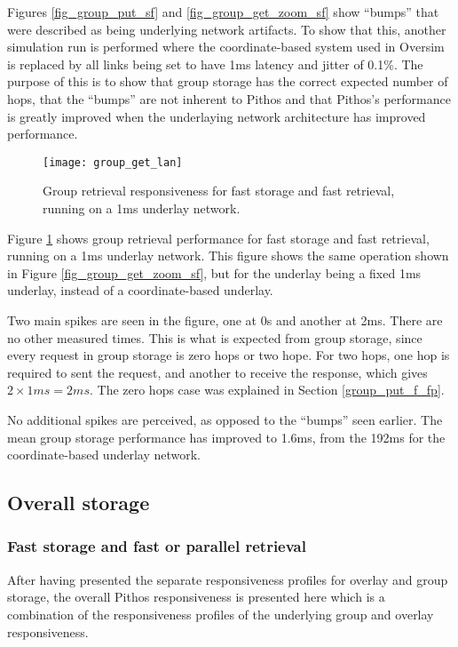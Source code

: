 Figures \ref{fig_group_put_sf} and \ref{fig_group_get_zoom_sf} show ``bumps'' that were described as being underlying network artifacts. To show that this, another simulation run is performed where the coordinate-based system used in Oversim is replaced by all links being set to have 1ms latency and jitter of 0.1\%. The purpose of this is to show that group storage has the correct expected number of hops, that the ``bumps'' are not inherent to Pithos and that Pithos's performance is greatly improved when the underlaying network architecture has improved performance.

\begin{figure}[htbp]
 \centering
 \texttt{[image: group\_get\_lan]}
 \caption{Group retrieval responsiveness for fast storage and fast retrieval, running on a 1ms underlay network.}
 \label{fig_group_get_lan}
\end{figure}
%
Figure \ref{fig_group_get_lan} shows group retrieval performance for fast storage and fast retrieval, running on a 1ms underlay network. This figure shows the same operation shown in Figure \ref{fig_group_get_zoom_sf}, but for the underlay being a fixed 1ms underlay, instead of a coordinate-based underlay.

Two main spikes are seen in the figure, one at 0s and another at 2ms. There are no other measured times. This is what is expected from group storage, since every request in group storage is zero hops or two hope. For two hops, one hop is required to sent the request, and another to receive the response, which gives $2\times 1 ms = 2 ms$. The zero hops case was explained in Section \ref{group_put_f_fp}.

No additional spikes are perceived, as opposed to the ``bumps'' seen earlier. The mean group storage performance has improved to 1.6ms, from the 192ms for the coordinate-based underlay network.

\subsection{Overall storage}

\subsubsection{Fast storage and fast or parallel retrieval}
After having presented the separate responsiveness profiles for overlay and group storage, the overall Pithos responsiveness is presented here which is a combination of the responsiveness profiles of the underlying group and overlay responsiveness.

